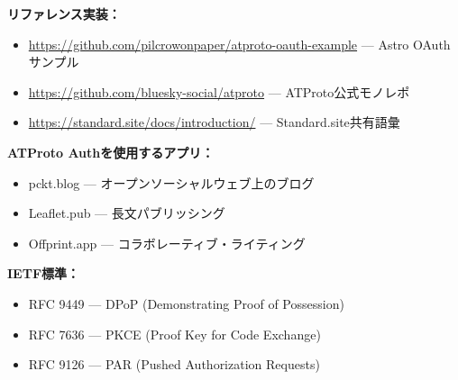 \documentclass[10pt,letterpaper,twocolumn]{article}
\begin{document}
\textbf{リファレンス実装：}
\begin{itemize}
  \item \url{https://github.com/pilcrowonpaper/atproto-oauth-example} --- Astro OAuthサンプル
  \item \url{https://github.com/bluesky-social/atproto} --- ATProto公式モノレポ
  \item \url{https://standard.site/docs/introduction/} --- Standard.site共有語彙
\end{itemize}

\textbf{ATProto Authを使用するアプリ：}
\begin{itemize}
  \item pckt.blog --- オープンソーシャルウェブ上のブログ
  \item Leaflet.pub --- 長文パブリッシング
  \item Offprint.app --- コラボレーティブ・ライティング
\end{itemize}

\textbf{IETF標準：}
\begin{itemize}
  \item RFC 9449 --- DPoP (Demonstrating Proof of Possession)
  \item RFC 7636 --- PKCE (Proof Key for Code Exchange)
  \item RFC 9126 --- PAR (Pushed Authorization Requests)
\end{itemize}

\vspace{0.5em}



\end{document}
